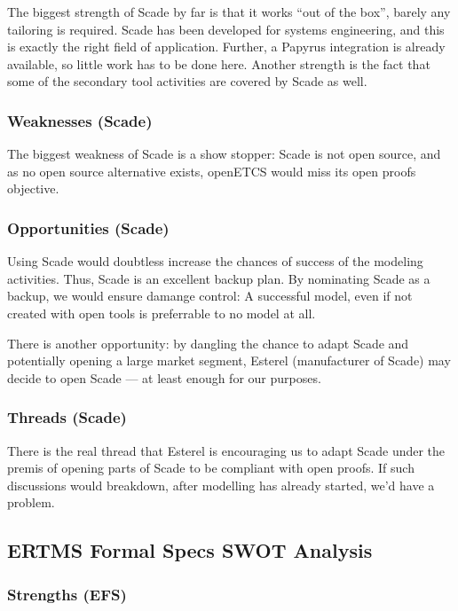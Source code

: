 The biggest strength of Scade by far is that it works ``out of the box'', barely any tailoring is required.  Scade has been developed for systems engineering, and this is exactly the right field of application.  Further, a Papyrus integration is already available, so little work has to be done here.  Another strength is the fact that some of the secondary tool activities are covered by Scade as well.

\subsubsection{Weaknesses (Scade)}

The biggest weakness of Scade is a show stopper: Scade is not open source, and as no open source alternative exists, openETCS would miss its open proofs objective.

\subsubsection{Opportunities (Scade)}

Using Scade would doubtless increase the chances of success of the modeling activities.  Thus, Scade is an excellent backup plan.  By nominating Scade as a backup, we would ensure damange control: A successful model, even if not created with open tools is preferrable to no model at all.

There is another opportunity: by dangling the chance to adapt Scade and potentially opening a large market segment, Esterel (manufacturer of Scade) may decide to open Scade --- at least enough for our purposes.

\subsubsection{Threads (Scade)}

There is the real thread that Esterel is encouraging us to adapt Scade under the premis of opening parts of Scade to be compliant with open proofs.  If such discussions would breakdown, after modelling has already started, we'd have a problem.

\subsection{ERTMS Formal Specs SWOT Analysis}

\subsubsection{Strengths (EFS)}


